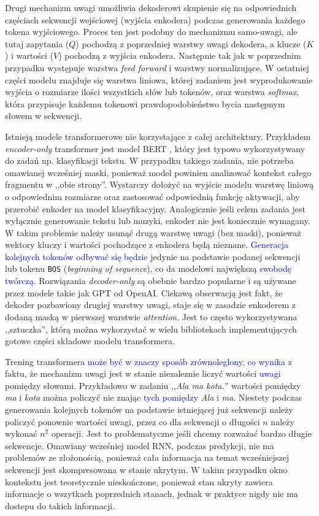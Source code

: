 \documentclass[data-science]{agh-wi} %
\begin{document}
Drugi mechanizm uwagi umożliwia dekoderowi skupienie się na odpowiednich częściach sekwencji wejściowej (wyjścia enkodera) podczas generowania każdego tokena wyjściowego. Proces ten jest podobny do mechanizmu samo-uwagi, ale tutaj zapytania ($Q$) pochodzą z poprzedniej warstwy uwagi dekodera, a klucze ($K$) i wartości ($V$) pochodzą z wyjścia enkodera. Następnie tak jak w poprzednim przypadku występuje warstwa \textit{feed forward} i warstwy normalizujące. W ostatniej części modelu znajduje się warstwa liniowa, której zadaniem jest wyprodukowanie wyjścia o rozmiarze ilości wszystkich słów lub tokenów, oraz warstwa \textit{softmax}, która przypisuje każdemu tokenowi prawdopodobieństwo bycia następnym słowem w sekwencji.

Istnieją modele transformerowe nie korzystające z całej architektury. Przykładem \textit{encoder-only} transformer jest model BERT \cite{bert}, który jest typowo wykorzystywany do zadań np. klasyfikacji tekstu. W przypadku takiego zadania, nie potrzeba omawianej wcześniej maski, ponieważ model powinien analizować kontekst całego fragmentu w ,,obie strony''. Wystarczy dołożyć na wyjście modelu warstwę liniową o odpowiednim rozmiarze oraz zastosować odpowiednią funkcję aktywacji, aby przerobić enkoder na model klasyfikacyjny.
Analogicznie jeśli celem zadania jest wyłącznie generowanie tekstu lub muzyki, enkoder nie jest koniecznie wymagany. W takim problemie należy usunąć drugą warstwę uwagi (bez maski), ponieważ wektory kluczy i wartości pochodzące z enkodera będą nieznane. \textcolor{blue}{Generacja kolejnych tokenów odbywać się będzie} jedynie na podstawie podanej sekwencji lub tokenu \texttt{BOS} (\textit{beginning of sequence}), co da modelowi największą \textcolor{blue}{swobodę twórczą}. Rozwiązania \textit{decoder-only} są obebnie bardzo popularne i są używane przez modele takie jak GPT od OpenAI. Ciekawą obserwacją jest fakt, że dekoder pozbawiony drugiej warstwy uwagi, staje się w zasadzie enkoderem z dodaną maską w pierwszej warstwie \textit{attention}. Jest to często wykorzystywana ,,sztuczka'', którą można wykorzystać w wielu bibliotekach implementujących gotowe części składowe modelu transformera.

Trening transformera \textcolor{blue}{może być w znaczy sposób zrównoleglony, co wynika} z faktu, że mechanizm uwagi jest w stanie niezaleznie liczyć wartości \textcolor{blue}{uwagi} pomiędzy słowami. Przykładowo w zadaniu ,,\textit{Ala ma kota.}'' wartości pomiędzy \textit{ma} i \textit{kota} można policzyć nie znając \textcolor{blue}{tych pomiędzy} \textit{Ala} i \textit{ma}. Niestety podczas generowania kolejnych tokenów na podstawie istniejącej już sekwencji należy policzyć ponownie wartości uwagi, przez co dla sekwencji o długości $n$ należy wykonać $n^2$ operacji. Jest to problematyczne jeśli chcemy rozważać bardzo długie sekwencje. Omawiany wcześniej model RNN, podczas predykcji, nie ma problemów ze złożonością, ponieważ cała informacja na temat wcześniejszej sekwencji jest skompresowana w stanie ukrytym. W takim przypadku okno kontekstu jest teoretycznie nieskończone, ponieważ stan ukryty zawiera informacje o wszytkach poprzednich stanach, jednak w praktyce nigdy nie ma dostepu do takich informacji.
\end{document}
